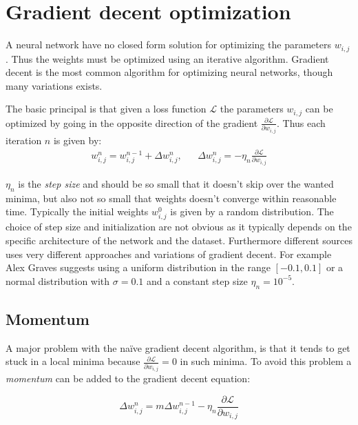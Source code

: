 \section{Gradient decent optimization}

A neural network have no closed form solution for optimizing the parameters $w_{i,j}$. Thus the weights must be optimized using an iterative algorithm. Gradient decent is the most common algorithm for optimizing neural networks, though many variations exists.

The basic principal is that given a loss function $\mathcal{L}$ the parameters $w_{i,j}$ can be optimized by going in the opposite direction of the gradient $\frac{\partial \mathcal{L}}{\partial w_{i,j}}$. Thus each iteration $n$ is given by:
\begin{equation}
\begin{aligned}
w_{i,j}^n = w_{i,j}^{n-1} + \Delta w_{i,j}^n, && \Delta w_{i,j}^n = - \eta_n \frac{\partial \mathcal{L}}{\partial w_{i,j}}
\end{aligned}
\end{equation}

$\eta_n$ is the \textit{step size} and should be so small that it doesn't skip over the wanted minima, but also not so small that weights doesn't converge within reasonable time. Typically the initial weights $w^0_{i,j}$ is given by a random distribution. The choice of step size and initialization are not obvious as it typically depends on the specific architecture of the network and the dataset. Furthermore different sources uses very different approaches and variations of gradient decent. For example Alex Graves \cite{alexgraves} suggests using a uniform distribution in the range $[-0.1, 0.1]$ or a normal distribution with $\sigma = 0.1$ and a constant step size $\eta_n = 10^{-5}$.

\subsection{Momentum}

A major problem with the naïve gradient decent algorithm, is that it tends to get stuck in a local minima because $\frac{\partial \mathcal{L}}{\partial w_{i,j}} = 0$ in such minima. To avoid this problem a \textit{momentum} can be added to the gradient decent equation:

\begin{equation}
\Delta w_{i,j}^n = m \Delta w_{i,j}^{n-1} - \eta_n \frac{\partial \mathcal{L}}{\partial w_{i,j}}
\end{equation}

